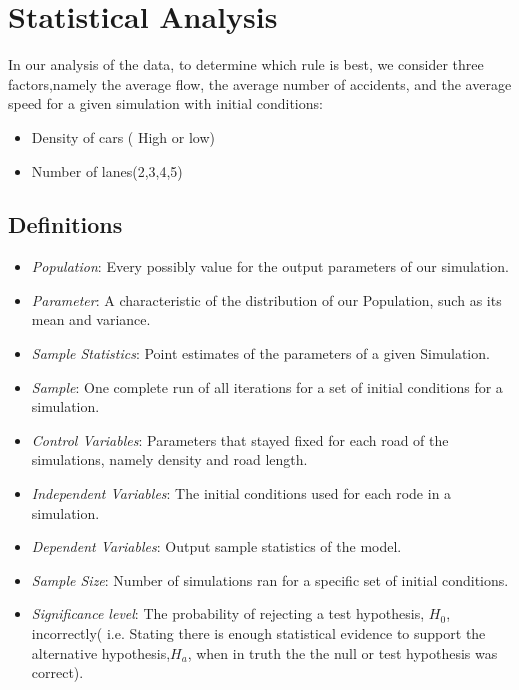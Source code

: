 \documentclass{amsart}
\begin{document}
\section{\bfseries{Statistical Analysis}}
	In our analysis of the data, to determine which rule is best, we consider three factors,namely the average flow, the average number of accidents, and the average speed for a given simulation with initial conditions:
	\begin{itemize}
		\item Density of cars ( High or low)
		\item Number of lanes(2,3,4,5)
	\end{itemize}
	
	\subsection{Definitions}
	
	\begin{itemize}
		\item \textit{Population}: Every possibly value for the output parameters of our simulation.
		\item \textit{Parameter}: A characteristic of the distribution of our Population, such as its mean and variance.
		\item \textit{Sample Statistics}: Point estimates of the parameters of a given Simulation.
		\item \textit{Sample}: One complete run of all iterations for a set of initial conditions for a simulation.
		\item \textit{Control Variables}: Parameters that stayed fixed for each road of the simulations, namely density and road length.
		\item \textit{Independent Variables}: The initial conditions used for each rode in a simulation.
		\item \textit{Dependent Variables}:  Output sample statistics of the model.
		\item\textit{Sample Size}: Number of simulations ran for a specific set of initial conditions.
		\item \textit{Significance level}: The probability of rejecting a test hypothesis, $H_0$, incorrectly( i.e. Stating there is enough statistical evidence to support the alternative hypothesis,$H_a$, when in truth the the null or test hypothesis was correct). 
	
	\end{itemize}
\end{document}
